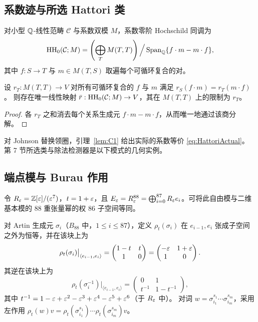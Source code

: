 \subsection{系数迹与所选 Hattori 类}

\begin{definition}[系数迹]\label{def:coefficient-HH0}
对小型 $\mathbb{Q}$-线性范畴 $\mathcal C$ 与系数双模 $M$，系数零阶 Hochschild 同调为
\[
\operatorname{HH}_{0}(\mathcal C;M)=
\left(\bigoplus_{T}M(T,T)\right)
\Big/
\operatorname{Span}_{\mathbb{Q}}\{f\cdot m-m\cdot f\},
\]
其中 $f:S\to T$ 与 $m\in M(T,S)$ 取遍每个可循环复合的对。
\end{definition}

\begin{lemma}[通过系数迹的下降]\label{lem:HH0-descent}
设 $r_T:M(T,T)\to V$ 对所有可循环复合的 $f$ 与 $m$ 满足 $r_S(f\cdot m)=r_T(m\cdot f)$。
则存在唯一线性映射 $\bar r:\operatorname{HH}_{0}(\mathcal C;M)\to V$，其在 $M(T,T)$ 上的限制为 $r_T$。
\end{lemma}

\begin{proof}
各 $r_T$ 之和消去每个关系生成元 $f\cdot m-m\cdot f$，从而唯一地通过该商分解。
\end{proof}

对 Johnson 替换领圈，引理~\ref{lem:C1} 给出实际的系数等价 \eqref{eq:HattoriActual}。
第 7 节所选类与除法检测器是以下模式的几何实例。

\subsection{端点模与 Burau 作用}

\begin{definition}[端点模]\label{def:endpoint-module}
令 $R_\varepsilon=\mathbb{Z}[\varepsilon]/(\varepsilon^7)$，$t=1+\varepsilon$，且
$E_\varepsilon=R_\varepsilon^{88}=\bigoplus_{i=0}^{87}R_\varepsilon e_i$。可将此自由模与二维基本模的
$88$ 重张量幂的权 $86$ 子空间等同。
\end{definition}

\begin{definition}\label{def:burau}
对 Artin 生成元 $\sigma_i$（$B_{88}$ 中，$1\le i\le87$），定义
$\rho_t(\sigma_i)$ 在 $e_{i-1},e_i$ 张成子空间之外为恒等，并在该块上为
\[
\rho_t(\sigma_i)\big|_{\langle e_{i-1},e_i\rangle}
=
\begin{pmatrix}1-t&t\\1&0\end{pmatrix}
=
\begin{pmatrix}-\varepsilon&1+\varepsilon\\1&0\end{pmatrix}.
\]
其逆在该块上为
\[
\rho_t(\sigma_i^{-1})\big|_{\langle e_{i-1},e_i\rangle}
=
\begin{pmatrix}0&1\\t^{-1}&1-t^{-1}\end{pmatrix},
\]
其中 $t^{-1}=1-\varepsilon+\varepsilon^2-\varepsilon^3+\varepsilon^4-\varepsilon^5+\varepsilon^6$（于 $R_\varepsilon$ 中）。
对词 $w=\sigma_{i_1}^{s_1}\cdots\sigma_{i_m}^{s_m}$，采用左作用
$\rho_t(w)v=\rho_t(\sigma_{i_1}^{s_1})\cdots
\rho_t(\sigma_{i_m}^{s_m})v$。
\end{definition}

